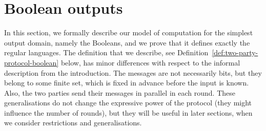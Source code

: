 
\section{Boolean outputs}
\label{sec:boolean-domain}

In this section, we formally describe our model of computation for the simplest
output domain, namely the Booleans, and we prove that it defines exactly the
regular languages.  The definition that we describe, see
Definition~\ref{def:two-party-protocol-boolean} below, has minor differences
with respect to the informal description from the introduction. The messages
are not necessarily bits, but they belong to some finite set, which is fixed in
advance before the input is known. Also,  the two parties send their messages
in parallel in each round. These generalisations do not change the expressive
power of the protocol (they might influence the number of rounds), but they
will be useful in later sections, when we consider restrictions and
generalisations. 

